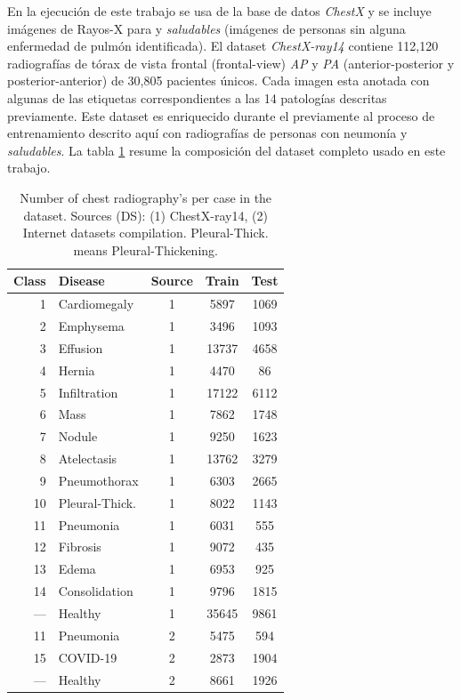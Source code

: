 {En la ejecución de este trabajo se usa de la base de datos \textit{ChestX}
\cite{wang2017chestx} y se incluye imágenes de Rayos-X para  y \textit{saludables}
(imágenes de personas sin alguna enfermedad de pulmón identificada). El dataset \textit{ChestX-ray14}
contiene 112,120 radiografías de tórax de vista frontal (frontal-view) \textit{AP} y \textit{PA}
(anterior-posterior y posterior-anterior) de 30,805 pacientes únicos. Cada imagen esta anotada con
algunas de las etiquetas correspondientes a las 14 patologías descritas previamente. Este dataset es
enriquecido durante el previamente al proceso de entrenamiento descrito aquí con radiografías de
personas con neumonía y \textit{saludables}. La tabla \ref{table_dataset} resume la composición del
dataset completo usado en este trabajo.

\begin{table}[!ht]
    \centering
    \begin{tabular}{| r |l | c | c | c |}
     \hline
     Class & Disease & Source & Train & Test  \\
     \hline\hline
     1  & Cardiomegaly       & 1 & 5897  & 1069 \\
     2  & Emphysema          & 1 & 3496  & 1093 \\
     3  & Effusion           & 1 & 13737 & 4658 \\
     4  & Hernia             & 1 & 4470  & 86   \\
     5  & Infiltration       & 1 & 17122 & 6112 \\
     6  & Mass               & 1 & 7862  & 1748 \\
     7  & Nodule             & 1 & 9250  & 1623 \\
     8  & Atelectasis        & 1 & 13762 & 3279 \\
     9  & Pneumothorax       & 1 & 6303  & 2665 \\
     10 & Pleural-Thick.     & 1 & 8022  & 1143 \\
     11 & Pneumonia          & 1 & 6031  & 555  \\
     12 & Fibrosis           & 1 & 9072  & 435  \\
     13 & Edema              & 1 & 6953  & 925  \\
     14 & Consolidation      & 1 & 9796  & 1815 \\
     ---&  Healthy           & 1 & 35645 & 9861 \\
     \hline
     11 & Pneumonia          & 2 & 5475  & 594  \\
     15 & COVID-19           & 2 & 2873  & 1904 \\
     ---&  Healthy           & 2 & 8661  & 1926 \\
     \hline
    \end{tabular}
    \caption{Number of chest radiography's per case in the dataset. Sources (DS): (1) ChestX-ray14,
             (2) Internet datasets compilation. Pleural-Thick. means Pleural-Thickening.}
    \label{table_dataset}
\end{table}

}
